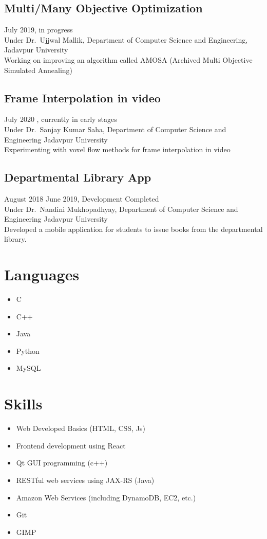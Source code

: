 \documentclass{article}
\begin{document}
\subsection{Multi/Many Objective Optimization}
July 2019, in progress\\
Under Dr.\ Ujjwal Mallik, 
Department of Computer Science and Engineering, 
Jadavpur University\\

Working on improving an algorithm called AMOSA
(Archived Multi Objective Simulated Annealing)


\subsection{Frame Interpolation in video}
July 2020 , currently in early stages\\
Under Dr.\ Sanjay Kumar Saha,
Department of Computer Science and Engineering
Jadavpur University\\

Experimenting with voxel flow methods for frame interpolation in video

\subsection{Departmental Library App}
August 2018 \- June 2019, Development Completed\\
Under Dr.\ Nandini Mukhopadhyay,
Department of Computer Science and Engineering
Jadavpur University\\

Developed a mobile application for students to issue books from
the departmental library.


\section{Languages} 
\begin{itemize}
	\item C
	\item C++
	\item Java
	\item Python
	\item MySQL
\end{itemize}

\section{Skills} 
\begin{itemize}
	\item Web Developed Basics (HTML, CSS, Js)
	\item Frontend development using React
	\item Qt GUI programming (c++)
	\item RESTful web services using JAX-RS (Java)
	\item Amazon Web Services (including DynamoDB, EC2, etc.)
	\item Git
	\item GIMP
\end{itemize}
\end{document}
